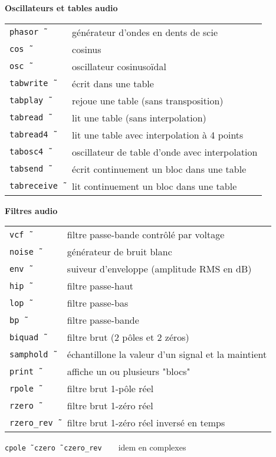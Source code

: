 \documentclass[a4paper, landscape, 10pt]{article}
\newcommand{\refcardtitle}[1]{
  \begin{center}
    \textbf{\small{#1}} %
  \end{center}
}
\begin{document}
\begin{multicols}{3}
  \columnbreak
  \refcardtitle{Oscillateurs et tables audio}
  \begin{tabularx}{9cm}{>{\tt}l X}
    phasor\~\ & générateur d'ondes en dents de scie \\
    cos\~\ & cosinus \\
    osc\~\ & oscillateur cosinusoïdal \\
    tabwrite\~\ & écrit dans une table \\
    tabplay\~\ & rejoue une table (sans transposition) \\
    tabread\~\ & lit une table (sans interpolation) \\
    tabread4\~\ & lit une table avec interpolation à 4 points \\
    tabosc4\~\ & oscillateur de table d'onde avec interpolation \\ 
    tabsend\~\ & écrit continuement un bloc dans une table \\
    tabreceive\~\ & lit continuement un bloc dans une table \\
  \end{tabularx}

  \refcardtitle{Filtres audio}
  \begin{tabularx}{9cm}{>{\tt}l X}
    vcf\~\ & filtre passe-bande contrôlé par voltage \\
    noise\~\ &  générateur de bruit blanc \\
    env\~\ & suiveur d'enveloppe (amplitude RMS en dB) \\
    hip\~\ &  filtre passe-haut \\
    lop\~\ &  filtre passe-bas \\ 
    bp\~\ &  filtre passe-bande \\
    biquad\~\ & filtre brut (2 pôles et 2 zéros) \\ 
    samphold\~\ & échantillone la valeur d'un signal et la maintient \\
    print\~\ & affiche un ou plusieurs "blocs" \\
    rpole\~\ & filtre brut 1-pôle réel \\
    rzero\~\ & filtre brut 1-zéro réel \\
    rzero\_rev\~\ & filtre brut 1-zéro réel inversé en temps \\
  \end{tabularx}
  \texttt{cpole\~\, czero\~\, czero\_rev}\ \ \ \ idem en complexes 


\end{multicols}
\end{document}
